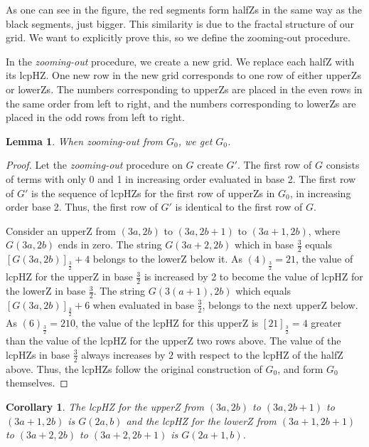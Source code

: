 \documentclass[12pt,reqno]{article}
\theoremstyle{plain}
\newtheorem{corollary}[theorem]{Corollary}
\newtheorem{lemma}[theorem]{Lemma}
\theoremstyle{definition}
\theoremstyle{remark}
\begin{document}
As one can see in the figure, the red segments form halfZs in the same way as the black segments, just bigger. This similarity is due to the fractal structure of our grid. We want to explicitly prove this, so we define the zooming-out procedure.

In the \textit{zooming-out} procedure, we create a new grid. We replace each halfZ with its lcpHZ. One new row in the new grid corresponds to one row of either upperZs or lowerZs. The numbers corresponding to upperZs are placed in the even rows in the same order from left to right, and the numbers corresponding to lowerZs are placed in the odd rows from left to right. 
 

\begin{lemma}
When zooming-out from $G_0$, we get $G_0$.
\end{lemma}

\begin{proof}
Let the \textit{zooming-out} procedure on $G $ create $G'$. The first row of $G$ consists of terms with only 0 and 1 in increasing order evaluated in base 2. The first row of $G'$ is the sequence of lcpHZs for the first row of upperZs in $G_0$, in increasing order base 2. Thus, the first row of $G'$ is identical to the first row of $G$.

Consider an upperZ from $(3a,2b)$ to $(3a,2b+1)$ to $(3a+1,2b)$, where $G(3a,2b)$ ends in zero. The string $G(3a+2,2b)$ which in base $\frac{3}{2}$ equals $[G(3a,2b)]_\frac{3}{2}+ 4$ belongs to the lowerZ below it. As $(4)_\frac{3}{2} = 21$, the value of lcpHZ for the upperZ in base $\frac{3}{2}$ is increased by 2 to become the value of lcpHZ for the lowerZ in base $\frac{3}{2}$. The string $G(3(a+1),2b)$ which equals $[G(3a,2b)]_\frac{3}{2}+ 6$ when evaluated in base $\frac{3}{2}$, belongs to the next upperZ below. As $(6)_\frac{3}{2} = 210$, the value of the lcpHZ for this upperZ is $[21]_{\frac{3}{2}} = 4$ greater than the value of the lcpHZ for the upperZ two rows above. The value of the lcpHZs in base $\frac{3}{2}$ always increases by $2$ with respect to the lcpHZ of the halfZ above. Thus, the lcpHZs follow the original construction of $G_0$, and form $G_0$ themselves.
\end{proof}

\begin{corollary}\label{cor:zoomvalue}
The lcpHZ for the upperZ from $(3a,2b)$ to $(3a,2b+1)$ to $(3a+1,2b)$ is $G(2a,b)$ and the lcpHZ for the lowerZ from $(3a+1,2b+1)$ to $(3a+2,2b)$ to $(3a+2,2b+1)$ is $G(2a+1,b)$.
\end{corollary}
\end{document}
